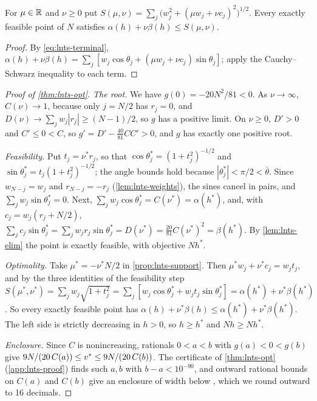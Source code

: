 \begin{proposition}\label{prop:lnts-support}
For $\mu\in\mathbb{R}$ and $\nu\ge0$ put $S(\mu,\nu)=\sum_j\bigl(w_j^2+(\mu w_j+\nu c_j)^2\bigr)^{1/2}$.
Every exactly feasible point of $N$ satisfies $\alpha(h)+\nu\beta(h)\le S(\mu,\nu)$.
\end{proposition}

\begin{proof}
By \eqref{eq:lnts-terminal}, $\alpha(h)+\nu\beta(h)=\sum_j[w_j\cos\theta_j+(\mu w_j+\nu c_j)\sin\theta_j]$; apply the Cauchy--Schwarz inequality to each term.
\end{proof}

\begin{proof}[Proof of \cref{thm:lnts-opt}]
\emph{The root.}
We have $g(0)=-20N^2/81<0$.
As $\nu\to\infty$, $C(\nu)\to1$, because only $j=N/2$ has $r_j=0$, and $D(\nu)\to\sum_jw_j|r_j|\ge(N-1)/2$, so $g$ has a positive limit.
On $\nu\ge0$, $D'>0$ and $C'\le0<C$, so $g'=D'-\frac{40}{81}CC'>0$, and $g$ has exactly one positive root.

\emph{Feasibility.}
Put $t_j=\nu^*r_j$, so that $\cos\theta^*_j=(1+t_j^2)^{-1/2}$ and $\sin\theta^*_j=t_j(1+t_j^2)^{-1/2}$; the angle bounds hold because $|\theta^*_j|<\pi/2<\bar\theta$.
Since $w_{N-j}=w_j$ and $r_{N-j}=-r_j$ (\cref{lem:lnts-weights}), the sines cancel in pairs, and $\sum_jw_j\sin\theta^*_j=0$.
Next, $\sum_jw_j\cos\theta^*_j=C(\nu^*)=\alpha(h^*)$, and, with $c_j=w_j(r_j+N/2)$, $\sum_jc_j\sin\theta^*_j=\sum_jw_jr_j\sin\theta^*_j=D(\nu^*)=\frac{20}{81}C(\nu^*)^2=\beta(h^*)$.
By \cref{lem:lnts-elim} the point is exactly feasible, with objective $Nh^*$.

\emph{Optimality.}
Take $\mu^*=-\nu^*N/2$ in \cref{prop:lnts-support}.
Then $\mu^*w_j+\nu^*c_j=w_jt_j$, and by the three identities of the feasibility step $S(\mu^*,\nu^*)=\sum_jw_j\sqrt{1+t_j^2}=\sum_j[w_j\cos\theta^*_j+w_jt_j\sin\theta^*_j]=\alpha(h^*)+\nu^*\beta(h^*)$.
So every exactly feasible point has $\alpha(h)+\nu^*\beta(h)\le\alpha(h^*)+\nu^*\beta(h^*)$.
The left side is strictly decreasing in $h>0$, so $h\ge h^*$ and $Nh\ge Nh^*$.

\emph{Enclosure.}
Since $C$ is nonincreasing, rationals $0<a<b$ with $g(a)<0<g(b)$ give $9N/(20\,C(a))\le v^{*}\le9N/(20\,C(b))$.
The certificate of \cref{thm:lnts-opt} (\cref{app:lnts-proof}) finds such $a,b$ with $b-a<10^{-90}$, and outward rational bounds on $C(a)$ and $C(b)$ give an enclosure of width below , which we round outward to 16 decimals.
\end{proof}
